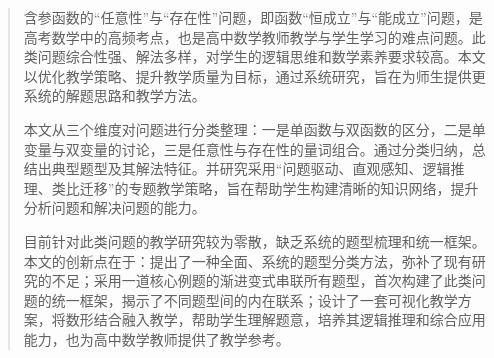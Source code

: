 
\begin{abstract}
含参函数的“任意性”与“存在性”问题，即函数“恒成立”与“能成立”问题，是高考数学中的高频考点，也是高中数学教师教学与学生学习的难点问题。此类问题综合性强、解法多样，对学生的逻辑思维和数学素养要求较高。本文以优化教学策略、提升教学质量为目标，通过系统研究，旨在为师生提供更系统的解题思路和教学方法。

本文从三个维度对问题进行分类整理：一是单函数与双函数的区分，二是单变量与双变量的讨论，三是任意性与存在性的量词组合。通过分类归纳，总结出典型题型及其解法特征。并研究采用“问题驱动、直观感知、逻辑推理、类比迁移”的专题教学策略，旨在帮助学生构建清晰的知识网络，提升分析问题和解决问题的能力。

目前针对此类问题的教学研究较为零散，缺乏系统的题型梳理和统一框架。本文的创新点在于：提出了一种全面、系统的题型分类方法，弥补了现有研究的不足；采用一道核心例题的渐进变式串联所有题型，首次构建了此类问题的统一框架，揭示了不同题型间的内在联系；设计了一套可视化教学方案，将数形结合融入教学，帮助学生理解题意，培养其逻辑推理和综合应用能力，也为高中数学教师提供了教学参考。
\end{abstract}



